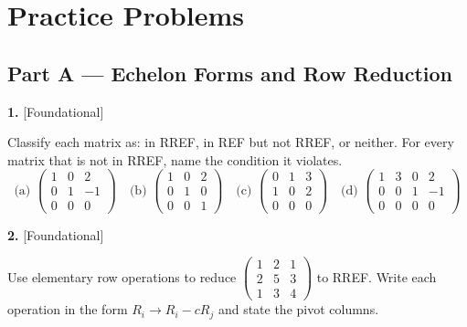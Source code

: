 \documentclass[11pt]{article}
\begin{document}
\section*{\large\color{ink} Practice Problems}
\subsection*{\normalsize\color{ink} Part A --- Echelon Forms and Row Reduction}
\begin{minipage}{\linewidth}\textbf{1.} \hfill{\scriptsize\color{ink}[Foundational]}\par\nopagebreak Classify each matrix as: in RREF, in REF but not RREF, or neither. For every matrix that is not in RREF, name the condition it violates. $$\text{(a) }\begin{pmatrix}1 & 0 & 2 \\ 0 & 1 & -1 \\ 0 & 0 & 0\end{pmatrix}\quad \text{(b) }\begin{pmatrix}1 & 0 & 2 \\ 0 & 1 & 0 \\ 0 & 0 & 1\end{pmatrix}\quad\text{(c) }\begin{pmatrix}0 & 1 & 3 \\ 1 & 0 & 2 \\ 0 & 0 & 0\end{pmatrix}\quad\text{(d) }\begin{pmatrix}1 & 3 & 0 & 2 \\ 0 & 0 & 1 & -1 \\ 0 & 0 & 0 & 0\end{pmatrix}$$
\vspace{2.5cm}\end{minipage}\par\vspace{4pt}
\begin{minipage}{\linewidth}\textbf{2.} \hfill{\scriptsize\color{ink}[Foundational]}\par\nopagebreak Use elementary row operations to reduce $\begin{pmatrix}1 & 2 & 1 \\ 2 & 5 & 3 \\ 1 & 3 & 4\end{pmatrix}$ to RREF. Write each operation in the form $R_i\to R_i-cR_j$ and state the pivot columns.
\vspace{3.4cm}\end{minipage}\par\vspace{4pt}
\end{document}
